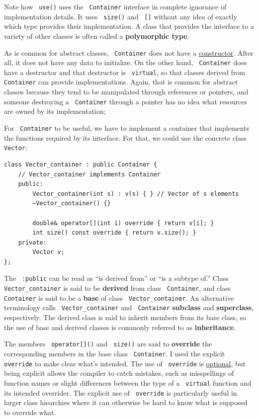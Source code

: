 \documentclass[11pt]{article}
\let\OldTexttt\texttt
\renewcommand{\texttt}[1]{\OldTexttt{\color{MidnightBlue} #1}}
\begin{document}
Note how \texttt{use()} uses the \texttt{Container} interface in complete ignorance of implementation details. It
uses \texttt{size()} and \texttt{[]} without any idea of exactly which type provides their implementation. A
class that provides the interface to a variety of other classes is often called a \textbf{polymorphic
type}.

As is common for abstract classes, \texttt{Container} does not have a \uline{constructor}. After all, it does not
have any data to initialize. On the other hand, \texttt{Container} does have a destructor and that
destructor is \texttt{virtual}, so that classes derived from \texttt{Container} can provide implementations.
Again, that is common for abstract classes because they tend to be manipulated through
references or pointers, and someone destroying a \texttt{Container} through a pointer has no idea what
resources are owned by its implementation;

For \texttt{Container} to be useful, we have to implement a container that implements the functions
required by its interface. For that, we could use the concrete class \texttt{Vector}:
\begin{verbatim}
class Vector_container : public Container {
    // Vector_container implements Container
    public:
        Vector_container(int s) : v(s) { } // Vector of s elements
        ~Vector_container() {}
        
        double& operator[](int i) override { return v[i]; }
        int size() const override { return v.size(); }
    private:
        Vector v;
};
\end{verbatim}
The \texttt{:public} can be read as ``is derived from'' or ``is a subtype of.'' Class \texttt{Vector\_container} is
said to be \textbf{derived} from class \texttt{Container}, and class \texttt{Container} is said to be a \textbf{base} of class
\texttt{Vector\_container}. An alternative terminology calls \texttt{Vector\_container} and \texttt{Container} \textbf{subclass} and
\textbf{superclass}, respectively. The derived class is said to inherit members from its base class, so
the use of base and derived classes is commonly referred to as \textbf{inheritance}.

The members \texttt{operator[]()} and \texttt{size()} are said to \textbf{override} the corresponding members in the base
class \texttt{Container}. I used the explicit \texttt{override} to make clear what’s intended. The use of \texttt{override}
is \uline{optional}, but being explicit allows the compiler to catch mistakes, such as misspellings of
function names or slight differences between the type of a \texttt{virtual} function and its intended
overrider. The explicit use of \texttt{override} is particularly useful in larger class hiearchies where
it can otherwise be hard to know what is supposed to override what.
\end{document}
